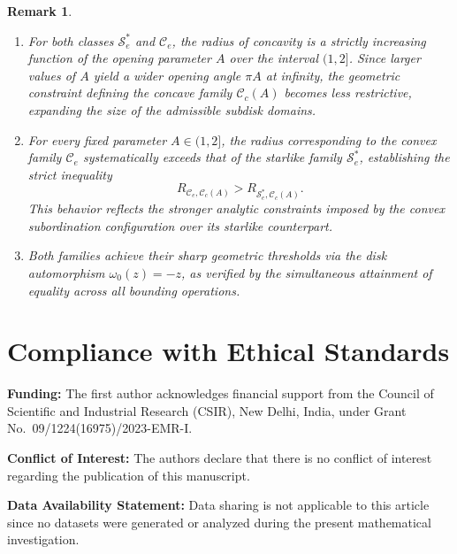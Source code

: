 \documentclass[12pt]{article}
\newtheorem{remark}[theorem]{Remark}
\begin{document}
\begin{remark}\label{rem:numerical_trends}
\begin{enumerate}
    \item For both classes $\mathcal{S}_e^*$ and $\mathcal{C}_e$, the radius of concavity is a strictly increasing function of the opening parameter $A$ over the interval $(1,2]$. Since larger values of $A$ yield a wider opening angle $\pi A$ at infinity, the geometric constraint defining the concave family $\mathcal{C}_c(A)$ becomes less restrictive, expanding the size of the admissible subdisk domains.
    \item For every fixed parameter $A \in (1,2]$, the radius corresponding to the convex family $\mathcal{C}_e$ systematically exceeds that of the starlike family $\mathcal{S}_e^*$, establishing the strict inequality
    \[
    R_{\mathcal{C}_e,\mathcal{C}_c(A)} > R_{\mathcal{S}_e^*,\mathcal{C}_c(A)}.
    \]
    This behavior reflects the stronger analytic constraints imposed by the convex subordination configuration over its starlike counterpart.
    \item Both families achieve their sharp geometric thresholds via the disk automorphism $\omega_0(z) = -z$, as verified by the simultaneous attainment of equality across all bounding operations.
\end{enumerate}
\end{remark}


\section*{Compliance with Ethical Standards}

\noindent
\textbf{Funding:} 
The first author acknowledges financial support from the Council of Scientific and Industrial Research (CSIR), New Delhi, India, under Grant No.~09/1224(16975)/2023-EMR-I.

\vspace{0.3em}

\noindent
\textbf{Conflict of Interest:} 
The authors declare that there is no conflict of interest regarding the publication of this manuscript.

\vspace{0.3em}

\noindent
\textbf{Data Availability Statement:} 
Data sharing is not applicable to this article since no datasets were generated or analyzed during the present mathematical investigation.
\end{document}
